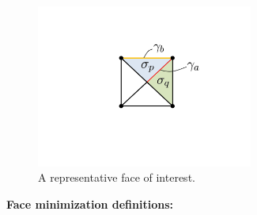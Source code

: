 \documentclass[11pt]{article} %
\begin{document}
\begin{figure} [!ht]
	\centering
	\includegraphics[width = 2.8in,trim=170 190 170 120,clip=true]{facetMinImage.pdf}
	\caption{A representative face of interest.}
	\label{fig:facetMin}
\end{figure}
\begin{center}
\textbf{Face minimization definitions:}
\end{center}
\end{document}
